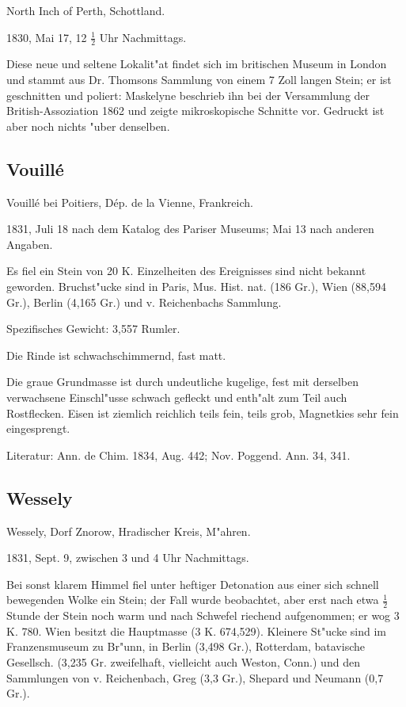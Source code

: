 \documentclass[a4paper, 11pt, oneside]{article}
\begin{document}
North Inch of Perth, Schottland.

1830, Mai 17, 12 $\frac{1}{2}$ Uhr Nachmittags.

Diese neue und seltene Lokalit"at findet sich im britischen Museum in London und stammt aus Dr. Thomsons Sammlung von einem 7 Zoll langen Stein; er ist geschnitten und poliert: Maskelyne beschrieb ihn bei der Versammlung der British-Assoziation 1862 und zeigte mikroskopische Schnitte vor. Gedruckt ist aber noch nichts "uber denselben.

\subsection{Vouillé}

Vouillé bei Poitiers, Dép. de la Vienne, Frankreich.

1831, Juli 18 nach dem Katalog des Pariser Museums; Mai 13 nach anderen Angaben.

Es fiel ein Stein von 20 K. Einzelheiten des Ereignisses sind nicht bekannt geworden. Bruchst"ucke sind in Paris, Mus. Hist. nat. (186 Gr.), Wien (88,594 Gr.), Berlin (4,165 Gr.) und v. Reichenbachs Sammlung.

Spezifisches Gewicht: 3,557 Rumler.

Die Rinde ist schwachschimmernd, fast matt.

Die graue Grundmasse ist durch undeutliche kugelige, fest mit derselben verwachsene Einschl"usse schwach gefleckt und enth"alt zum Teil auch Rostflecken. Eisen ist ziemlich reichlich teils fein, teils grob, Magnetkies sehr fein eingesprengt.

Literatur: Ann. de Chim. 1834, Aug. 442; Nov. Poggend. Ann. 34, 341.

\subsection{Wessely}

Wessely, Dorf Znorow, Hradischer Kreis, M"ahren.

1831, Sept. 9, zwischen 3 und 4 Uhr Nachmittags.

Bei sonst klarem Himmel fiel unter heftiger Detonation aus einer sich schnell bewegenden Wolke ein Stein; der Fall wurde beobachtet, aber erst nach etwa $\frac{1}{2}$ Stunde der Stein noch warm und nach Schwefel riechend aufgenommen; er wog 3 K. 780. Wien besitzt die Hauptmasse (3 K. 674,529). Kleinere St"ucke sind im Franzensmuseum zu Br"unn, in Berlin (3,498 Gr.), Rotterdam, batavische Gesellsch. (3,235 Gr. zweifelhaft, vielleicht auch Weston, Conn.) und den Sammlungen von v. Reichenbach, Greg (3,3 Gr.), Shepard und Neumann (0,7 Gr.).
\end{document}
